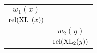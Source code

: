 \begin{table}[H]
\begin{tabular}{|c|c|}
    $w_1(x)$                                      &                                               \\
    $\textnormal{rel}(\textnormal{XL}_1(x))$      &                                               \\
                                                    & $w_2(y)$                                      \\
                                                    & $\textnormal{rel}(\textnormal{XL}_2(y))$      \\ \hline
    \end{tabular}
\end{table}